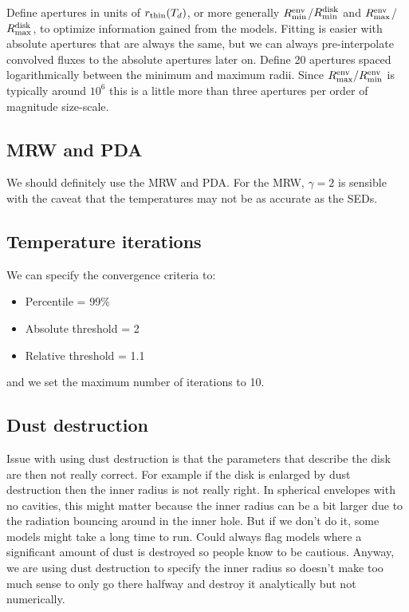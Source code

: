 \documentclass[10pt]{article}
\newcommand{\rmind}{R^{\rm disk}_{\rm min}}
\newcommand{\rmaxd}{R^{\rm disk}_{\rm max}}
\newcommand{\rmine}{R^{\rm env}_{\rm min}}
\newcommand{\rmaxe}{R^{\rm env}_{\rm max}}
\begin{document}
Define apertures in units of $r_{\rm thin}(T_d)$, or more generally $\rmine$/$\rmind$ and $\rmaxe$/$\rmaxd$, to optimize information gained from the models. Fitting is easier with absolute apertures that are always the same, but we can always pre-interpolate convolved fluxes to the absolute apertures later on. Define 20 apertures spaced logarithmically between the minimum and maximum radii. Since $\rmaxe/\rmine$ is typically around $10^6$ this is a little more than three apertures per order of magnitude size-scale.

\subsection{MRW and PDA}

We should definitely use the MRW and PDA. For the MRW, $\gamma=2$ is sensible with the caveat that the temperatures may not be as accurate as the SEDs.

\subsection{Temperature iterations}

We can specify the convergence criteria to:

\begin{itemize}
\item Percentile = 99\%
\item Absolute threshold = 2
\item Relative threshold = 1.1
\end{itemize}

and we set the maximum number of iterations to 10.

\subsection{Dust destruction}

Issue with using dust destruction is that the parameters that describe the disk are then not really correct. For example if the disk is enlarged by dust destruction then the inner radius is not really right. In spherical envelopes with no cavities, this might matter because the inner radius can be a bit larger due to the radiation bouncing around in the inner hole. But if we don't do it, some models might take a long time to run. Could always flag models where a significant amount of dust is destroyed so people know to be cautious. Anyway, we are using dust destruction to specify the inner radius so doesn't make too much sense to only go there halfway and destroy it analytically but not numerically.
\end{document}

